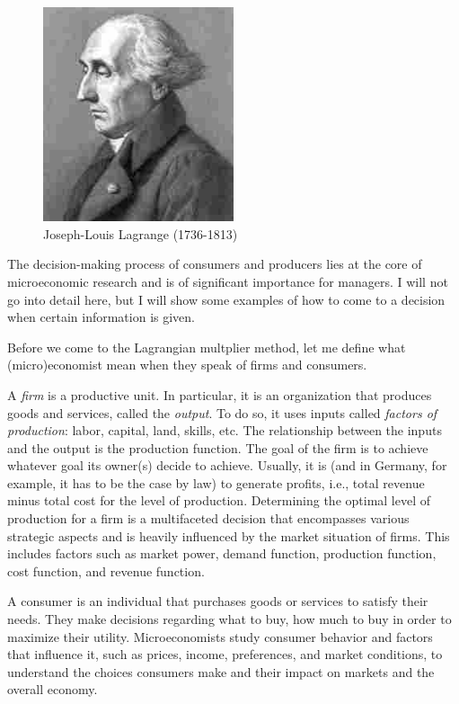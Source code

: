 \documentclass[
  12pt,
  oneside]{book}
\theoremstyle{definition}
\theoremstyle{definition}
\theoremstyle{definition}
\theoremstyle{definition}
\theoremstyle{remark}
\begin{document}
\begin{figure}
\centering
\includegraphics[width=0.5\textwidth,height=\textheight]{fig/Lagrange.jpg}
\caption[\label{fig:Lagrange} Joseph-Louis Lagrange (1736-1813)]{\label{fig:Lagrange} Joseph-Louis Lagrange (1736-1813)\footnotemark{}}
\end{figure}

The decision-making process of consumers and producers lies at the core of microeconomic research and is of significant importance for managers. I will not go into detail here, but I will show some examples of how to come to a decision when certain information is given.

Before we come to the Lagrangian multplier method, let me define what (micro)economist mean when they speak of firms and consumers.

A \emph{firm} is a productive unit. In particular, it is an organization that produces goods and services, called the \emph{output}. To do so, it uses inputs called \emph{factors of production}: labor, capital, land, skills, etc. The relationship between the inputs and the output is the production function. The goal of the firm is to achieve whatever goal its owner(s) decide to achieve. Usually, it is (and in Germany, for example, it has to be the case by law) to generate profits, i.e., total revenue minus total cost for the level of production.
Determining the optimal level of production for a firm is a multifaceted decision that encompasses various strategic aspects and is heavily influenced by the market situation of firms. This includes factors such as market power, demand function, production function, cost function, and revenue function.

A consumer is an individual that purchases goods or services to satisfy their needs. They make decisions regarding what to buy, how much to buy in order to maximize their utility. Microeconomists study consumer behavior and factors that influence it, such as prices, income, preferences, and market conditions, to understand the choices consumers make and their impact on markets and the overall economy.
\end{document}
